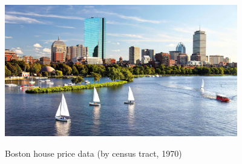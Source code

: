 \documentclass{beamer}\usepackage[]{graphicx}\usepackage[]{color}
\begin{document}
\begin{darkframes}
\begin{frame}
      
    \end{frame}
    
    
    
    
    
    
    \begin{frame}
    
      \begin{center}
        \includegraphics[width=4in]{boston} \\
      \end{center}
      
      Boston house price data (by census tract, 1970)
    \end{frame}
    
    
    
    
    
    
    
    \begin{frame}
     

\end{frame}
\end{darkframes}
\end{document}
